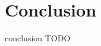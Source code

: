\documentclass[final]{scrreprt} %
\begin{document}
\chapter{Conclusion}

conclusion TODO
\end{document}
